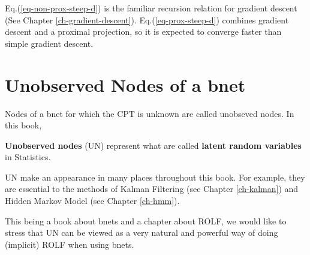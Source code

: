 Eq.(\ref{eq-non-prox-steep-d}) is the familiar 
recursion relation for 
gradient
descent (See Chapter \ref{ch-gradient-descent}).
Eq.(\ref{eq-prox-steep-d})
combines gradient descent
and a proximal projection,
so it is expected to 
converge faster than
simple gradient descent.

\section{Unobserved Nodes of a bnet}

Nodes of a bnet for which the CPT is unknown are called unobseved nodes.
In this book, \hiddenNodes


{\bf Unobserved nodes} (UN) represent what are called
 {\bf latent random variables} in Statistics.
 
 UN make an appearance in many
 places throughout this book.
 For example, they are essential 
 to the methods of
 Kalman Filtering (see Chapter \ref{ch-kalman}) and
 Hidden Markov Model (see Chapter \ref{ch-hmm}).
 
This being a book about bnets and a chapter about ROLF,
we would like to stress that UN 
can be viewed as a very natural and powerful way of
doing (implicit) ROLF when using bnets.

